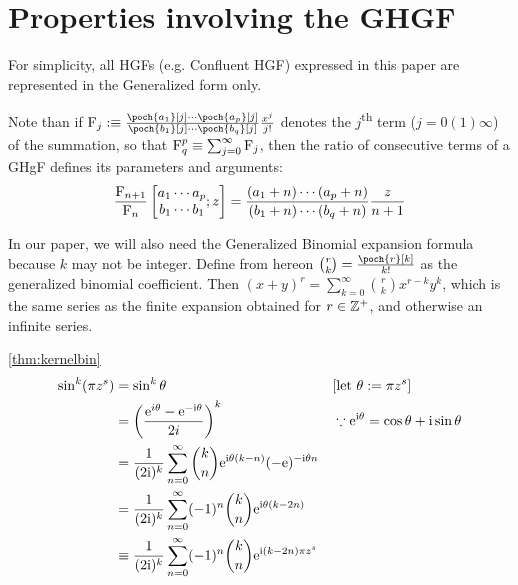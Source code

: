 \section{Properties involving the GHGF} \label{subsec:app-prop_ghgf}
\begin{rmk} \label{rmk:ghgf}
    For simplicity, all HGFs (e.g. Confluent HGF) expressed in this paper are represented in the Generalized form only.

    Note than if $\Fhyp_j :\equiv \frac{\poch{a_1}[j] \cdots \poch{a_p}[j]}{\poch{b_1}[j] \cdots \poch{b_q}[j]} \frac{x^j}{j!}$ denotes the $j$\textsuperscript{th} term ($j = 0(1)\infty$) of the summation, so that $\operatorname{F}^p_q \equiv \sum_{j=0}^\infty \operatorname{F}_j$, then the ratio of consecutive terms of a GHgF defines its parameters and arguments:
    \[ \frac{\operatorname{F}_{n+1}}{\operatorname{F}_n} \left[ \begin{matrix} a_1 \cdots a_p \\ b_1 \cdots b_1 \end{matrix}; z \right] = \frac{(a_1 + n) \cdots (a_p +n)}{(b_1 +n)\cdots(b_q +n)} \frac{z}{n+1} \] \label{eq:hgfratio}

    In our paper, we will also need the Generalized Binomial expansion formula because $k$ may not be integer. Define from hereon ${r \choose k} = {\poch{r}[k] \over k!}$ as the generalized binomial coefficient. Then $(x+y)^r = \sum_{k=0}^\infty {r \choose k} x^{r-k} y^k$, which is the same series as the finite expansion obtained for $r \in \mathbb Z^+$, and otherwise an infinite series.
\end{rmk}

\begin{proofof}{\autoref{thm:kernelbin}}
    \begin{align*}
        \sin^k(\pi z^s) &= \sin^k \theta &&\text{[let $\theta:= \pi z^s$]}\\
        &= \left( \frac{\mathrm e^{i\theta} - \mathrm e^{-\mathrm i\theta}}{2i} \right)^k  && \because \mathrm e^{\mathrm i \theta} = \cos \theta + \mathrm i \sin \theta\\
        &= \frac{1}{(2\mathrm i)^k} \sum_{n=0}^\infty {k \choose n} \mathrm e^{\mathrm i \theta (k-n)} (-\mathrm e)^{-\mathrm i \theta n}\\
        &= \frac{1}{(2\mathrm i)^k} \sum_{n=0}^\infty (-1)^n {k \choose n} \mathrm e^{\mathrm i \theta (k-2n)}\\
        &\equiv \frac{1}{(2\mathrm i)^k} \sum_{n=0}^\infty (-1)^n {k \choose n} \mathrm e^{\mathrm i (k-2n) \pi z^s}
    \end{align*}
\end{proofof}

